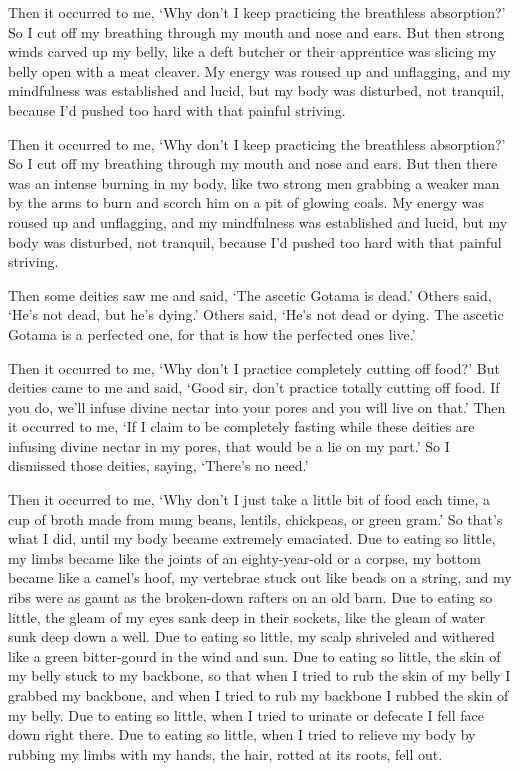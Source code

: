 \documentclass[12pt,openany]{book}%
\begin{document}
Then it occurred to me, ‘Why don’t I keep practicing the breathless absorption?’ So I cut off my breathing through my mouth and nose and ears. But then strong winds carved up my belly, like a deft butcher or their apprentice was slicing my belly open with a meat cleaver. My energy was roused up and unflagging, and my mindfulness was established and lucid, but my body was disturbed, not tranquil, because I’d pushed too hard with that painful striving. 

Then it occurred to me, ‘Why don’t I keep practicing the breathless absorption?’ So I cut off my breathing through my mouth and nose and ears. But then there was an intense burning in my body, like two strong men grabbing a weaker man by the arms to burn and scorch him on a pit of glowing coals. My energy was roused up and unflagging, and my mindfulness was established and lucid, but my body was disturbed, not tranquil, because I’d pushed too hard with that painful striving. 

Then some deities saw me and said, ‘The ascetic Gotama is dead.’ Others said, ‘He’s not dead, but he’s dying.’ Others said, ‘He’s not dead or dying. The ascetic Gotama is a perfected one, for that is how the perfected ones live.’ 

Then it occurred to me, ‘Why don’t I practice completely cutting off food?’ But deities came to me and said, ‘Good sir, don’t practice totally cutting off food. If you do, we’ll infuse divine nectar into your pores and you will live on that.’ Then it occurred to me, ‘If I claim to be completely fasting while these deities are infusing divine nectar in my pores, that would be a lie on my part.’ So I dismissed those deities, saying, ‘There’s no need.’ 

Then it occurred to me, ‘Why don’t I just take a little bit of food each time, a cup of broth made from mung beans, lentils, chickpeas, or green gram.’ So that’s what I did, until my body became extremely emaciated. Due to eating so little, my limbs became like the joints of an eighty-year-old or a corpse, my bottom became like a camel’s hoof, my vertebrae stuck out like beads on a string, and my ribs were as gaunt as the broken-down rafters on an old barn. Due to eating so little, the gleam of my eyes sank deep in their sockets, like the gleam of water sunk deep down a well. Due to eating so little, my scalp shriveled and withered like a green bitter-gourd in the wind and sun. Due to eating so little, the skin of my belly stuck to my backbone, so that when I tried to rub the skin of my belly I grabbed my backbone, and when I tried to rub my backbone I rubbed the skin of my belly. Due to eating so little, when I tried to urinate or defecate I fell face down right there. Due to eating so little, when I tried to relieve my body by rubbing my limbs with my hands, the hair, rotted at its roots, fell out. 
\end{document}
